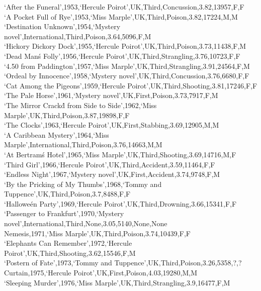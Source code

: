 \documentclass{mproj}
\begin{document}
`After the Funeral',1953,`Hercule Poirot',UK,Third,Concussion,3.82,13957,F,F\\
`A Pocket Full of Rye',1953,`Miss Marple',UK,Third,Poison,3.82,17224,M,M\\
`Destination Unknown',1954,`Mystery novel',International,Third,Poison,3.64,5096,F,M\\
`Hickory Dickory Dock',1955,`Hercule Poirot',UK,Third,Poison,3.73,11438,F,M\\
`Dead Man\'s Folly',1956,`Hercule Poirot',UK,Third,Strangling,3.76,10723,F,F\\
`4.50 from Paddington',1957,`Miss Marple',UK,Third,Strangling,3.91,24564,F,M\\
`Ordeal by Innocence',1958,`Mystery novel',UK,Third,Concussion,3.76,6680,F,F\\
`Cat Among the Pigeons',1959,`Hercule Poirot',UK,Third,Shooting,3.81,17246,F,F\\
`The Pale Horse',1961,`Mystery novel',UK,First,Poison,3.73,7917,F,M\\
`The Mirror Crack\'d from Side to Side',1962,`Miss Marple',UK,Third,Poison,3.87,19898,F,F\\
`The Clocks',1963,`Hercule Poirot',UK,First,Stabbing,3.69,12905,M,M\\
`A Caribbean Mystery',1964,`Miss Marple',International,Third,Poison,3.76,14663,M,M\\
`At Bertram\'s Hotel',1965,`Miss Marple',UK,Third,Shooting,3.69,14716,M,F\\
`Third Girl',1966,`Hercule Poirot',UK,Third,Accident,3.59,11464,F,F\\
`Endless Night',1967,`Mystery novel',UK,First,Accident,3.74,9748,F,M\\
`By the Pricking of My Thumbs',1968,`Tommy and Tuppence',UK,Third,Poison,3.7,8488,F,F\\
`Hallowe\'en Party',1969,`Hercule Poirot',UK,Third,Drowning,3.66,15341,F,F\\
`Passenger to Frankfurt',1970,`Mystery novel',International,Third,None,3.05,5140,None,None\\
Nemesis,1971,`Miss Marple',UK,Third,Poison,3.74,10439,F,F\\
`Elephants Can Remember',1972,`Hercule Poirot',UK,Third,Shooting,3.62,15546,F,M\\
`Postern of Fate',1973,`Tommy and Tuppence',UK,Third,Poison,3.26,5358,?,?\\
Curtain,1975,`Hercule Poirot',UK,First,Poison,4.03,19280,M,M\\
`Sleeping Murder',1976,`Miss Marple',UK,Third,Strangling,3.9,16477,F,M\\
\end{document}
